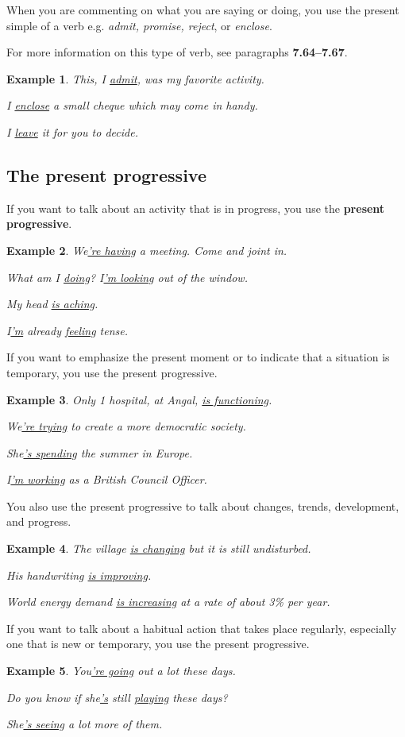 \documentclass[oneside]{book}
\numberwithin{equation}{section}
\newtheorem{example}{Example}[section]
\begin{document}
%
\noindent{} When you are commenting on what you are saying or doing, you use the present simple of a verb e.g. \textit{admit, promise, reject}, or \textit{enclose}.

For more information on this type of verb, see paragraphs \textbf{7.64--7.67}.
\begin{example}
    This, I \underline{admit}, was my favorite activity.
    
    I \underline{enclose} a small cheque which may come in handy.
    
    I \underline{leave} it for you to decide.
\end{example}

\subsection{The present progressive}
\noindent{} If you want to talk about an activity that is in progress, you use the \textbf{present progressive}.
\begin{example}
    We\underline{'re having} a meeting. Come and joint in.
    
    What am I \underline{doing}? I\underline{'m looking} out of the window.
    
    My head \underline{is aching}.
    
    I\underline{'m} already \underline{feeling} tense.
\end{example}
%
\noindent{} If you want to emphasize the present moment or to indicate that a situation is temporary, you use the present progressive.
\begin{example}
    Only 1 hospital, at Angal, \underline{is functioning}.
    
    We\underline{'re trying} to create a more democratic society.
    
    She\underline{'s spending} the summer in Europe.
    
    I\underline{'m working} as a British Council Officer.
\end{example}
%
\noindent{} You also use the present progressive to talk about changes, trends, development, and progress.
\begin{example}
    The village \underline{is changing} but it is still undisturbed.
    
    His handwriting \underline{is improving}.
    
    World energy demand \underline{is increasing} at a rate of about 3\% per year.
\end{example}
%
\noindent{} If you want to talk about a habitual action that takes place regularly, especially one that is new or temporary, you use the present progressive.
\begin{example}
    You\underline{'re going} out a lot these days.
    
    Do you know if she\underline{'s} still \underline{playing} these days?
    
    She\underline{'s seeing} a lot more of them.
\end{example}
\end{document}
